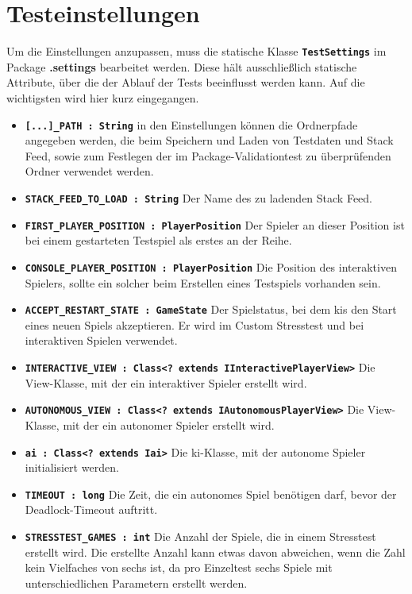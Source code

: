 \documentclass[
							a4paper, 
							11pt, 
							openany, 
							liststotoc,
							parskip=half, 
   							headings=normal
						]{scrreprt}
\begin{document}
{\clearpage

\section{Testeinstellungen} \label{se:testing_settings}
Um die Einstellungen anzupassen, muss die statische Klasse \textbf{\texttt{TestSettings}} im Package \textbf{.settings} bearbeitet werden.
Diese hält ausschließlich statische Attribute, über die der Ablauf der Tests beeinflusst werden kann. Auf die wichtigsten wird hier kurz eingegangen.
\begin{itemize}
	\item \textbf{\texttt{[...]\_PATH : String}} in den Einstellungen können die Ordnerpfade angegeben werden, die beim Speichern und Laden von Testdaten und Stack Feed, sowie zum Festlegen der im Package-Validationtest zu überprüfenden Ordner verwendet werden.
	\item \textbf{\texttt{STACK\_FEED\_TO\_LOAD : String}} Der Name des zu ladenden Stack Feed.
	\item \textbf{\texttt{FIRST\_PLAYER\_POSITION : PlayerPosition}} Der Spieler an dieser Position ist bei einem gestarteten Testspiel als erstes an der Reihe.
	\item \textbf{\texttt{CONSOLE\_PLAYER\_POSITION : PlayerPosition}} Die Position des interaktiven Spielers, sollte ein solcher beim Erstellen eines Testspiels vorhanden sein.
	\item \textbf{\texttt{ACCEPT\_RESTART\_STATE : GameState}} Der Spielstatus, bei dem \acs{ki}s den Start eines neuen Spiels akzeptieren. Er wird im Custom Stresstest und bei interaktiven Spielen verwendet.
	\item \textbf{\texttt{INTERACTIVE\_VIEW : Class{\textless}? extends IInteractivePlayerView{\textgreater}}}
Die Vi\-ew-Klas\-se, mit der ein interaktiver Spieler erstellt wird. 
	\item \textbf{\texttt{AUTONOMOUS\_VIEW : Class{\textless}? extends IAutonomousPlayerView{\textgreater}}}
Die Vi\-ew-\linebreak
Klas\-se, mit der ein autonomer Spieler erstellt wird.
	\item \textbf{\texttt{\acs{ai} : Class{\textless}? extends I\acs{ai}{\textgreater}}} Die \acs{ki}-Klasse, mit der autonome Spieler initialisiert werden.
	\item \textbf{\texttt{TIMEOUT : long}} Die Zeit, die ein autonomes Spiel benötigen darf, bevor der Deadlock-Timeout auftritt.
	\item \textbf{\texttt{STRESSTEST\_GAMES : int}} Die Anzahl der Spiele, die in einem Stresstest erstellt wird. Die erstellte Anzahl kann etwas davon abweichen, wenn die Zahl kein Vielfaches von sechs ist, da pro Einzeltest sechs Spiele mit unterschiedlichen Parametern erstellt werden.

\end{itemize}}
\end{document}
